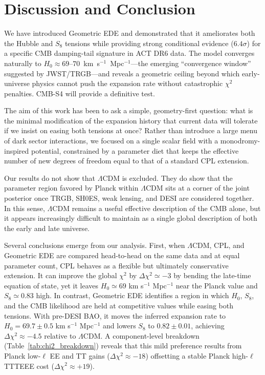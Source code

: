 \documentclass[a4paper,11pt]{article}
\begin{document}
\section{Discussion and Conclusion}

We have introduced Geometric EDE and demonstrated that it ameliorates both the Hubble and $S_8$ tensions while providing strong conditional evidence ($6.4\sigma$) for a specific CMB damping-tail signature in ACT DR6 data. The model converges naturally to $H_0 \approx 69$--$70$~km~s$^{-1}$~Mpc$^{-1}$---the emerging ``convergence window'' suggested by JWST/TRGB---and reveals a geometric ceiling beyond which early-universe physics cannot push the expansion rate without catastrophic $\chi^2$ penalties. CMB-S4 will provide a definitive test.

The aim of this work has been to ask a simple, geometry-first question: what is the minimal modification of the expansion history that current data will tolerate if we insist on easing both tensions at once? Rather than introduce a large menu of dark sector interactions, we focused on a single scalar field with a monodromy-inspired potential, constrained by a parameter diet that keeps the effective number of new degrees of freedom equal to that of a standard CPL extension.

Our results do not show that $\Lambda$CDM is excluded. They do show that the parameter region favored by Planck within $\Lambda$CDM sits at a corner of the joint posterior once TRGB, SH0ES, weak lensing, and DESI are considered together. In this sense, $\Lambda$CDM remains a useful effective description of the CMB alone, but it appears increasingly difficult to maintain as a single global description of both the early and late universe.

Several conclusions emerge from our analysis. First, when $\Lambda$CDM, CPL, and Geometric EDE are compared head-to-head on the same data and at equal parameter count, CPL behaves as a flexible but ultimately conservative extension. It can improve the global $\chi^2$ by $\Delta\chi^2 \simeq -3$ by bending the late-time equation of state, yet it leaves $H_0 \simeq 69$ km s$^{-1}$ Mpc$^{-1}$ near the Planck value and $S_8 \simeq 0.83$ high. In contrast, Geometric EDE identifies a region in which $H_0$, $S_8$, and the CMB likelihood are held at competitive values while easing both tensions. With pre-DESI BAO, it moves the inferred expansion rate to $H_0 = 69.7 \pm 0.5$ km s$^{-1}$ Mpc$^{-1}$ and lowers $S_8$ to $0.82 \pm 0.01$, achieving $\Delta\chi^2 \approx -4.5$ relative to $\Lambda$CDM. A component-level breakdown (Table~\ref{tab:chi2_breakdown}) reveals that this mild preference results from Planck low-$\ell$ EE and TT gains ($\Delta\chi^2 \approx -18$) offsetting a stable Planck high-$\ell$ TTTEEE cost ($\Delta\chi^2 \approx +19$).
\end{document}

